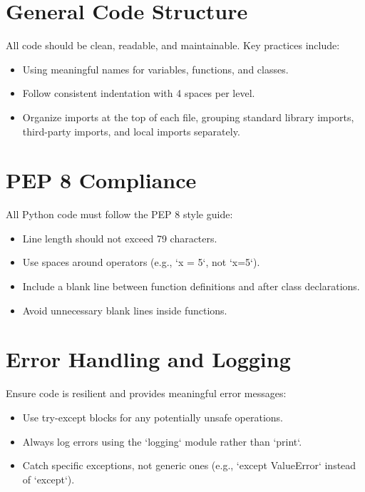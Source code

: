 \documentclass[11pt,a4paper]{article}
\begin{document}
\section*{General Code Structure}
All code should be clean, readable, and maintainable. Key practices include:
\begin{itemize}
    \item Using meaningful names for variables, functions, and classes.
    \item Follow consistent indentation with 4 spaces per level.
    \item Organize imports at the top of each file, grouping standard library imports, third-party imports, and local imports separately.
\end{itemize}

\section*{PEP 8 Compliance}
All Python code must follow the PEP 8 style guide:
\begin{itemize}
    \item Line length should not exceed 79 characters.
    \item Use spaces around operators (e.g., `x = 5`, not `x=5`).
    \item Include a blank line between function definitions and after class declarations.
    \item Avoid unnecessary blank lines inside functions.
\end{itemize}

\section*{Error Handling and Logging}
Ensure code is resilient and provides meaningful error messages:
\begin{itemize}
    \item Use try-except blocks for any potentially unsafe operations.
    \item Always log errors using the `logging` module rather than `print`.
    \item Catch specific exceptions, not generic ones (e.g., `except ValueError` instead of `except`).
\end{itemize}
\end{document}
